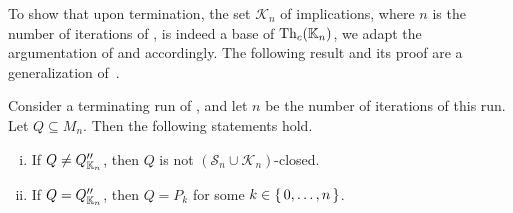 To show that upon termination, the set $\mathcal{K}_{n}$ of implications, where $n$ is the
number of iterations of , is indeed a base of
$\operatorname{Th}_{c}({\mathbb{K}}_{n})$, we adapt the argumentation of  and
 accordingly.  The following result and its proof are a
generalization of~\cite[Lemma~6.3]{Diss-Felix}.

\begin{Proposition}
  \label{prop:property-of-confident-bases-with-growing-sets-of-attributes}
  Consider a terminating run of , and let $n$
  be the number of iterations of this run.  Let $Q \subseteq M_{n}$.   Then the following
  statements hold.
  \begin{enumerate}[i. ]
  \item If $Q \neq Q_{{\mathbb{K}}_{n}}''$, then $Q$ is not $(\mathcal{S}_{n} \cup
    \mathcal{K}_{n})$-closed.
  \item If $Q = Q_{{\mathbb{K}}_{n}}''$, then $Q = P_{k}$ for some $k \in {\ensuremath{\{\, 0, \dots, n \,\}}}$.
  \end{enumerate}
\end{Proposition}
